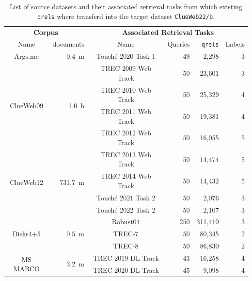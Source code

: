 \begin{table}[h!]
    \centering
    \footnotesize
    \caption{List of source datasets and their associated retrieval tasks from which existing \texttt{qrels} where transferd into the target dataset \texttt{ClueWeb22/b}.}
    \label{tab:datasets}
    \begin{tabular}{crcrrr}
        \toprule
        \multicolumn{2}{c}{\textbf{Corpus}} & \multicolumn{4}{c}{\textbf{ Associated Retrieval Tasks}} \\
        \cmidrule(lr){1-2} \cmidrule(lr){3-6}
        Name & documents  & Name & Queries &\texttt{qrels} & Labels \\
        \toprule
        
        Args.me & 0.4~m & Touché 2020 Task 1 & 49 & 2,298 & 3 \\
        \midrule

        \multirow{4}{*}{ClueWeb09} & \multirow{4}{*}{1.0~b} & TREC 2009 Web Track & 50 & 23,601 & 3 \\
        & & TREC 2010 Web Track & 50 & 25,329 & 4 \\
        & & TREC 2011 Web Track & 50 & 19,381 & 4\\
        & & TREC 2012 Web Track & 50 & 16,055 & 5 \\
        \midrule

        \multirow{4}{*}{ClueWeb12} & \multirow{4}{*}{731.7~m} & TREC 2013 Web Track & 50 & 14,474 & 5 \\
        & & TREC 2014 Web Track & 50 & 14,432 & 5 \\
        & & Touché 2021 Task 2 & 50 & 2,076 & 3 \\
        & & Touché 2022 Task 2 & 50 & 2,107 & 3 \\
        \midrule

        \multirow{3}{*}{Disks4+5} & \multirow{3}{*}{0.5~m} & Robust04 & 250 & 311,410 & 3 \\
        & & TREC-7 & 50 & 80,345 & 2 \\
        & & TREC-8 & 50 & 86,830 & 2 \\
        \midrule

        \multirow{2}{*}{MS MARCO} & \multirow{2}{*}{3.2~m} & TREC 2019 DL Track & 43 & 16,258 & 4 \\
        & & TREC 2020 DL Track & 45 & 9,098 & 4 \\
        
        \bottomrule
    \end{tabular}
\end{table}

